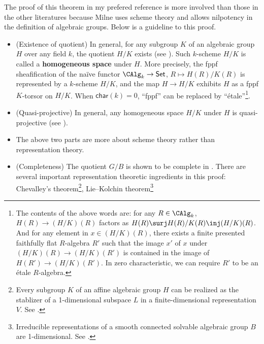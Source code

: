 	\begin{rem}
		The proof of this theorem in my prefered reference \cite{M} is more involved than those in the other literatures because Milne uses scheme theory and allows nilpotency in the definition of algebraic groups. Below is a guideline to this proof.

		\begin{itemize}
			\item
				(Existence of quotient) In general, for any subgroup $K$ of an algebraic group $H$ over any field $k$, the quotient $H/K$ exists (see \cite[Section 5.c]{M}). Such $k$-scheme $H/K$ is called a \textbf{homogeneous space} under $H$. More precisely, the fppf sheafification of the naïve functor $\CAlg_k \to \mathsf{Set}$, $R\mapsto H(R)/K(R)$ is represented by a $k$-scheme $H/K$, and the map $H \to H/K$ exhibits $H$ as a fppf $K$-torsor on $H/K$. When $\mathsf{char}(k)=0$, ``fppf'' can be replaced by ``étale''\footnote{The contents of the above words are: for any $R\in \CAlg_k$, $H(R) \to (H/K)(R)$ factors as $H(R) \surj H(R)/K(R) \inj (H/K)(R)$. And for any element in $x\in (H/K)(R)$, there exists a finite presented faithfully flat $R$-algebra $R'$ such that the image $x'$ of $x$ under $(H/K)(R)\to (H/K)(R')$ is contained in the image of $H(R') \to (H/K)(R')$. In zero characteristic, we can require $R'$ to be an étale $R$-algebra.}.

			\item
				(Quasi-projective) In general, any homogeneous space $H/K$ under $H$ is quasi-projective (see \cite[Section 8.k]{M}).

			\item 
				The above two parts are more about scheme theory rather than representation theory.

			\item
				(Completeness) The quotient $G/B$ is shown to be complete in \cite[Section 17]{M}. There are several important representation theoretic ingredients in this proof: Chevalley's theorem\footnote{Every subgroup $K$ of an affine algebraic group $H$ can be realized as the stablizer of a 1-dimensional subspace $L$ in a finite-dimensional representation $V$. See \cite[Section 4.h]{M}.}, Lie--Kolchin theorem\footnote{Irreducible representations of a smooth connected solvable algebraic group $B$ are 1-dimensional. See \cite[Section 16.d]{M}.}
		\end{itemize}

	\end{rem}

